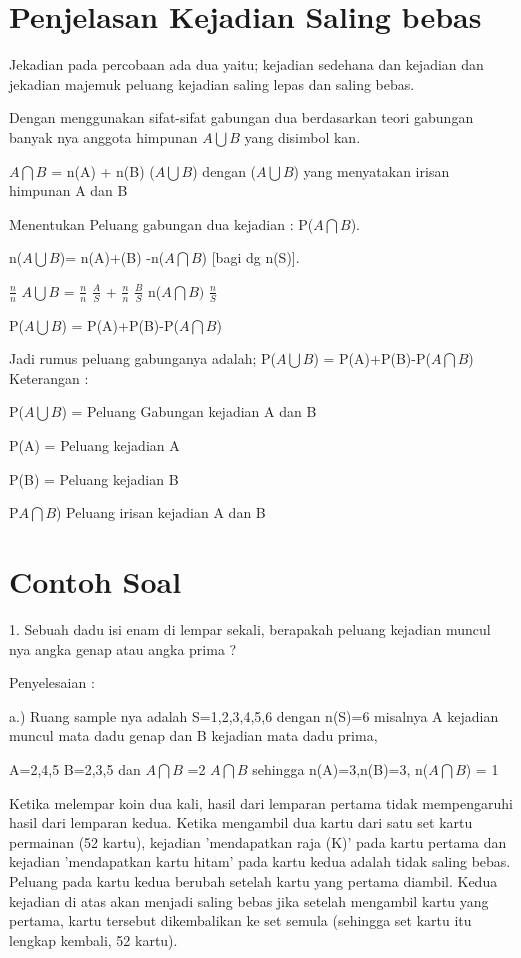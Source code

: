 \documentclass[11pt,fleqn]{book} %
\begin{document}
{\section{Penjelasan Kejadian Saling bebas}
\vspace{0.5cm} 
Jekadian pada percobaan ada dua yaitu;
kejadian sedehana dan kejadian dan jekadian majemuk
peluang kejadian saling lepas dan saling bebas.

Dengan menggunakan sifat-sifat gabungan dua berdasarkan teori gabungan banyak nya anggota himpunan $A\bigcup B$ yang disimbol kan.



$A\bigcap B$ = n(A) + n(B) ($A\bigcup B$) dengan  ($A\bigcup B$) yang menyatakan irisan himpunan A dan B

Menentukan Peluang gabungan dua kejadian : P($A\bigcap B$).

n($A\bigcup B$)= n(A)+(B) -n($A\bigcap B$) [bagi dg n(S)]. 

$\frac{n}{n}$ $A\bigcup B$ = $\frac{n}{n}$ $\frac{A}{S}$ + $\frac{n}{n}$ $\frac{B}{S}$ n($A\bigcap B)$ $\frac{n}S$

P($A\bigcup B$) = P(A)+P(B)-P($A\bigcap B$)

Jadi rumus peluang gabunganya adalah;
P($A\bigcup B$) = P(A)+P(B)-P($A\bigcap B$)
Keterangan :

P($A\bigcup B$) = Peluang Gabungan kejadian A dan B

P(A) = Peluang kejadian A

P(B) = Peluang kejadian B

P$A\bigcap B$) Peluang irisan kejadian A dan B



\section{Contoh Soal}

1. Sebuah dadu isi enam di lempar sekali, berapakah peluang kejadian muncul nya angka genap atau angka prima ? 

Penyelesaian :

a.) Ruang sample nya adalah S={1,2,3,4,5,6} dengan n(S)=6
misalnya A kejadian muncul mata dadu genap dan B kejadian mata dadu prima,

A={2,4,5} B={2,3,5} dan $A\bigcap B$ ={2}
$A\bigcap B$
sehingga n(A)=3,n(B)=3, n($A\bigcap B$) = 1

Ketika melempar koin dua kali, hasil dari lemparan pertama tidak mempengaruhi hasil dari lemparan kedua.
\vspace{1cm} 
Ketika mengambil dua kartu dari satu set kartu permainan (52 kartu), kejadian 'mendapatkan raja (K)' pada kartu pertama dan kejadian 'mendapatkan kartu hitam' pada kartu kedua adalah tidak saling bebas. Peluang pada kartu kedua berubah setelah kartu yang pertama diambil. Kedua kejadian di atas akan menjadi saling bebas jika setelah mengambil kartu yang pertama, kartu tersebut dikembalikan ke set semula (sehingga set kartu itu lengkap kembali, 52 kartu).
\vspace{1cm} 

}
\end{document}
